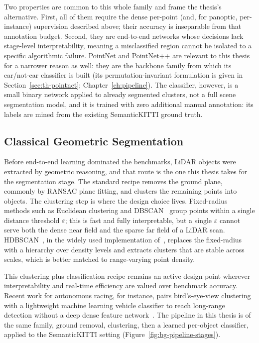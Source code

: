 Two properties are common to this whole family and frame the thesis's alternative.
First, all of them require the dense per-point (and, for panoptic, per-instance)
supervision described above; their accuracy is inseparable from that annotation budget.
Second, they are end-to-end networks whose decisions lack stage-level interpretability,
meaning a misclassified region cannot be isolated to a specific algorithmic failure.
PointNet and PointNet++ are
relevant to this thesis for a narrower reason as well: they are the backbone family from
which its car/not-car classifier is built (its permutation-invariant formulation is given
in Section~\ref{sec:th-pointnet}; Chapter~\ref{ch:pipeline}). The classifier, however, is a
small binary network applied to already segmented clusters, not a full scene
segmentation model, and it is trained with zero additional manual annotation: its labels are
mined from the existing SemanticKITTI ground truth.

\subsection{Classical Geometric Segmentation}
\label{sec:bg-classical}

Before end-to-end learning dominated the benchmarks, LiDAR objects were extracted by
geometric reasoning, and that route is the one this thesis takes for the segmentation
stage. The standard recipe removes the ground plane, commonly by RANSAC plane
fitting, and clusters the remaining points into objects. The clustering step is
where the design choice lives. Fixed-radius methods such as Euclidean clustering and
DBSCAN~\cite{ester1996dbscan} group points within a single distance threshold
$\varepsilon$; this is fast and fully interpretable, but a single $\varepsilon$ cannot
serve both the dense near field and the sparse far field of a LiDAR scan.
HDBSCAN~\cite{campello2013hdbscan}, in the widely used implementation
of~\cite{mcinnes2017hdbscan}, replaces the fixed-radius with a hierarchy over density
levels and extracts clusters that are stable across scales, which is better matched to
range-varying point density.

This clustering plus classification recipe remains an active design point wherever
interpretability and real-time efficiency are valued over benchmark accuracy. Recent
work for autonomous racing, for instance, pairs bird's-eye-view clustering with a
lightweight machine learning vehicle classifier to reach long-range detection without a
deep dense feature network~\cite{lim2025longrange}. The pipeline in this thesis is of
the same family, ground removal, clustering, then a learned per-object classifier,
applied to the SemanticKITTI setting (Figure~\ref{fig:bg-pipeline-stages}).

